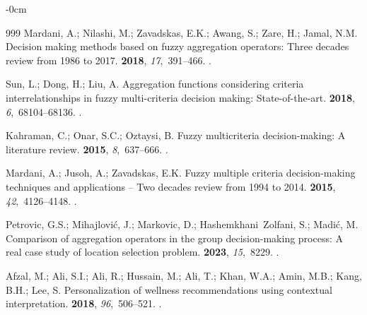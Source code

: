 \documentclass[mathematics,article,submit,moreauthors]{Definitions/mdpi}
\begin{document}
\begin{adjustwidth}{-\extralength}{0cm}
\begin{thebibliography}{999}
    Mardani, A.; Nilashi, M.; Zavadskas, E.K.; Awang, S.; Zare, H.; Jamal, N.M.
    \newblock Decision making methods based on fuzzy aggregation operators: Three
    decades review from 1986 to 2017.
     {\bf 2018}, {\em 17},~391--466.
    .
    
    Sun, L.; Dong, H.; Liu, A.
    \newblock Aggregation functions considering criteria interrelationships in
    fuzzy multi-criteria decision making: State-of-the-art.
     {\bf 2018}, {\em 6},~68104--68136.
    .
    
    Kahraman, C.; Onar, S.C.; Oztaysi, B.
    \newblock Fuzzy multicriteria decision-making: A literature review.
    {\bf 2015}, {\em 8},~637--666.
    .
    
    Mardani, A.; Jusoh, A.; Zavadskas, E.K.
    \newblock Fuzzy multiple criteria decision-making techniques and applications
    -- Two decades review from 1994 to 2014.
     {\bf 2015}, {\em
        42},~4126--4148.
    .
    
    Petrovic, G.S.; Mihajlović, J.; Markovic, D.; Hashemkhani~Zolfani, S.; Madić,
    M.
    \newblock Comparison of aggregation operators in the group decision-making
    process: A real case study of location selection problem.
     {\bf 2023}, {\em 15},~8229.
    .

    Afzal, M.; Ali, S.I.; Ali, R.; Hussain, M.; Ali, T.; Khan, W.A.; Amin, M.B.;
    Kang, B.H.; Lee, S.
    \newblock Personalization of wellness recommendations using contextual
    interpretation.
     {\bf 2018}, {\em
        96},~506--521.
    .


\end{thebibliography}
\end{adjustwidth}
\end{document}
